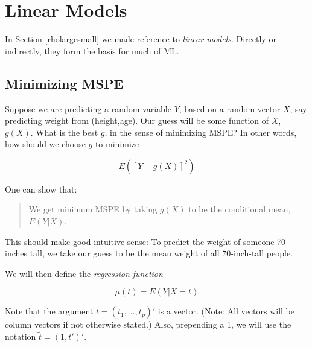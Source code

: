 \chapter{Linear Models}    
\label{chap:linmod}   

In Section \ref{rholargesmall} we made reference to \textit{linear
models}.  Directly or indirectly, they form the basis for much of ML.

\section{Minimizing MSPE}

Suppose we are predicting a random variable $Y$, based on a random
vector $X$, say predicting weight from (height,age).  Our guess will be
some function of $X$, $g(X)$.  What is the best $g$, in the sense of
minimizing MSPE?  In other words, how should we choose $g$ to minimize

\begin{equation}
\label{mspe}
E \left ( [Y - g(X)]^2 \right )
\end{equation}

% 
% 

One can show that:

\begin{quote}
We get minimum MSPE by taking $g(X)$ to be the conditional mean, $E(Y|X)$.
\end{quote}

This should make good intuitive sense:  To predict the weight of
someone 70 inches tall, we take our guess to be the mean weight of all
70-inch-tall people.

We will then define the \textit{regression function}

\begin{equation}
\mu(t) = E (Y | X = t)
\end{equation}

Note that the argument $t = (t_1,...,t_p)'$ is a vector.  (Note:  All
vectors will be column vectors if not otherwise stated.)
Also, prepending a 1, we will use the notation $\widetilde{t} = (1,t')'$.

